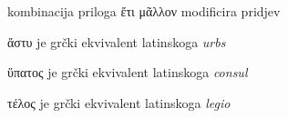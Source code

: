 
\begin{description}[noitemsep]
\item[ἔτι μᾶλλον πολλοὶ] kombinacija priloga ἔτι μᾶλλον modificira pridjev
\item[ἐν ἄστει]	ἄστυ je grčki ekvivalent latinskoga \textit{urbs}
\item[τοὺς ὑπάτους] ὕπατος je grčki ekvivalent latinskoga \textit{consul}
\item[τελῶν] τέλος je grčki ekvivalent latinskoga \textit{legio}
\end{description}


